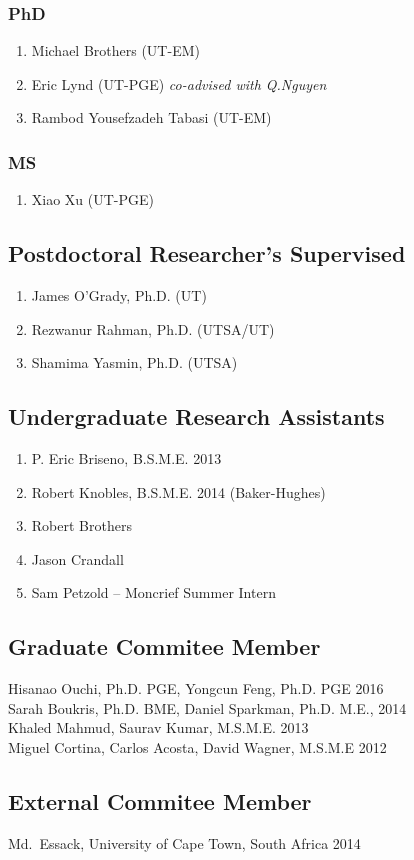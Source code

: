 \subsubsection*{PhD}
\begin{enumerate}
    \item Michael Brothers (UT-EM)
    \item Eric Lynd (UT-PGE) \emph{co-advised with Q.Nguyen}
    \item Rambod Yousefzadeh Tabasi (UT-EM)
\end{enumerate}

\subsubsection*{MS}
\begin{enumerate}
    \item Xiao Xu (UT-PGE)
\end{enumerate}

\subsection*{Postdoctoral Researcher's Supervised}
  \begin{enumerate}
      \item James O'Grady, Ph.D. (UT)
      \item Rezwanur Rahman, Ph.D. (UTSA/UT)
      \item Shamima Yasmin, Ph.D. (UTSA)
  \end{enumerate}

\subsection*{Undergraduate Research Assistants}
  \begin{enumerate}
    \item P. Eric Briseno, B.S.M.E. 2013
    \item Robert Knobles, B.S.M.E. 2014 (Baker-Hughes)
    \item Robert Brothers
    \item Jason Crandall
    \item Sam Petzold -- Moncrief Summer Intern
  \end{enumerate}

\subsection*{Graduate Commitee Member}
Hisanao Ouchi, Ph.D. PGE, Yongcun Feng, Ph.D. PGE 2016 \\
Sarah Boukris, Ph.D. BME, Daniel Sparkman, Ph.D. M.E., 2014 \\
Khaled Mahmud, Saurav Kumar, M.S.M.E. 2013 \\
Miguel Cortina, Carlos Acosta, David Wagner, M.S.M.E 2012 

\subsection*{External Commitee Member}
Md.~Essack, University of Cape Town, South Africa 2014
